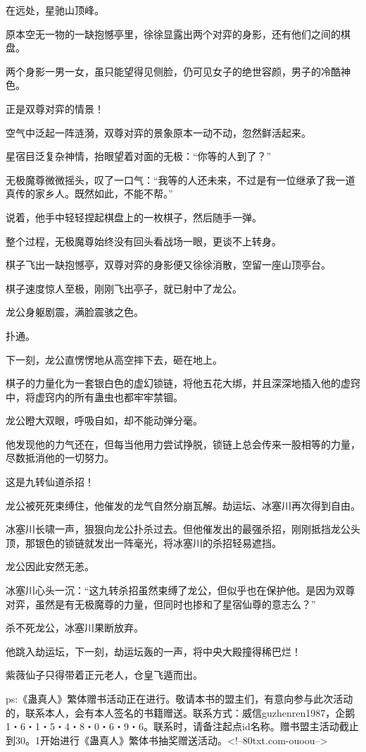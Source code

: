 \begin{this_body}
在远处，星驰山顶峰。

原本空无一物的一缺抱憾亭里，徐徐显露出两个对弈的身影，还有他们之间的棋盘。

两个身影一男一女，虽只能望得见侧脸，仍可见女子的绝世容颜，男子的冷酷神色。

正是双尊对弈的情景！

空气中泛起一阵涟漪，双尊对弈的景象原本一动不动，忽然鲜活起来。

星宿目泛复杂神情，抬眼望着对面的无极：“你等的人到了？”

无极魔尊微微摇头，叹了一口气：“我等的人还未来，不过是有一位继承了我一道真传的家乡人。既然如此，不能不帮。”

说着，他手中轻轻捏起棋盘上的一枚棋子，然后随手一弹。

整个过程，无极魔尊始终没有回头看战场一眼，更谈不上转身。

棋子飞出一缺抱憾亭，双尊对弈的身影便又徐徐消散，空留一座山顶亭台。

棋子速度惊人至极，刚刚飞出亭子，就已射中了龙公。

龙公身躯剧震，满脸震骇之色。

扑通。

下一刻，龙公直愣愣地从高空摔下去，砸在地上。

棋子的力量化为一套银白色的虚幻锁链，将他五花大绑，并且深深地插入他的虚窍中，将虚窍内的所有蛊虫也都牢牢禁锢。

龙公瞪大双眼，呼吸自如，却不能动弹分毫。

他发现他的力气还在，但每当他用力尝试挣脱，锁链上总会传来一股相等的力量，尽数抵消他的一切努力。

这是九转仙道杀招！

龙公被死死束缚住，他催发的龙气自然分崩瓦解。劫运坛、冰塞川再次得到自由。

冰塞川长啸一声，狠狠向龙公扑杀过去。但他催发出的最强杀招，刚刚抵挡龙公头顶，那银色的锁链就发出一阵毫光，将冰塞川的杀招轻易遮挡。

龙公因此安然无恙。

冰塞川心头一沉：“这九转杀招虽然束缚了龙公，但似乎也在保护他。是因为双尊对弈，虽然是有无极魔尊的力量，但同时也掺和了星宿仙尊的意志么？”

杀不死龙公，冰塞川果断放弃。

他跳入劫运坛，下一刻，劫运坛轰的一声，将中央大殿撞得稀巴烂！

紫薇仙子只得带着正元老人，仓皇飞遁而出。

ps:《蛊真人》繁体赠书活动正在进行。敬请本书的盟主们，有意向参与此次活动的，联系本人，会有本人签名的书籍赠送。联系方式：威信guzhenren1987，企鹅1・6・1・5・4・8・0・6・9・6。联系时，请备注起点id名称。赠书盟主活动截止到30。1开始进行《蛊真人》繁体书抽奖赠送活动。<!--80txt.com-ouoou-->

\end{this_body}

